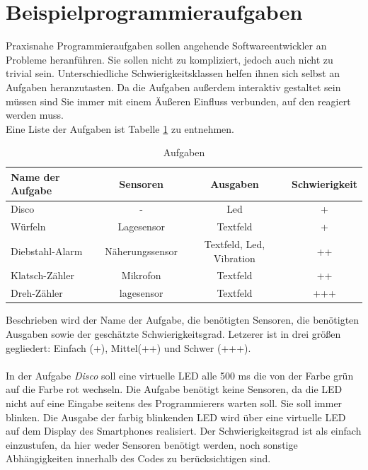 \documentclass[11pt,a4paper]{report}
\begin{document}
\section{Beispielprogrammieraufgaben}\label{sec:activities}
Praxisnahe Programmieraufgaben sollen angehende Softwareentwickler an Probleme heranführen.
Sie sollen nicht zu kompliziert, jedoch auch nicht zu trivial sein.
Unterschiedliche Schwierigkeitsklassen helfen ihnen sich selbst an Aufgaben heranzutasten.
Da die Aufgaben außerdem interaktiv gestaltet sein müssen sind Sie immer mit einem Äußeren Einfluss verbunden, auf den reagiert werden muss.
\\
Eine Liste der Aufgaben ist Tabelle \ref{tab:excercises} zu entnehmen.
\begin{table}[htbp]
  \centering
  \begin{tabular}{|l|c|c|c|}
      \hline
      \textbf{Name der Aufgabe} & \textbf{Sensoren} & \textbf{Ausgaben} & \textbf{Schwierigkeit} \\
      \hline
      Disco & - & Led & + \\
      \hline
      Würfeln & Lagesensor & Textfeld &+ \\
      \hline
      Diebstahl-Alarm & Näherungssensor & Textfeld, Led, Vibration & ++ \\
      \hline
      Klatsch-Zähler & Mikrofon & Textfeld & ++ \\
      \hline
      Dreh-Zähler & lagesensor & Textfeld & +++ \\
      \hline
  \end{tabular}
  \caption{Aufgaben}
  \label{tab:excercises}
\end{table}
Beschrieben wird der Name der Aufgabe, die benötigten Sensoren, die benötigten Ausgaben sowie der geschätzte Schwierigkeitsgrad.
Letzerer ist in drei größen gegliedert:
Einfach (+), Mittel(++) und Schwer (+++).
\\\\
In der Aufgabe \textit{Disco} soll eine virtuelle LED alle 500 ms die von der Farbe grün auf die Farbe rot wechseln.
Die Aufgabe benötigt keine Sensoren, da die LED nicht auf eine Eingabe seitens des Programmierers warten soll.
Sie soll immer blinken.
Die Ausgabe der farbig blinkenden LED wird über eine virtuelle LED auf dem Display des Smartphones realisiert.
Der Schwierigkeitsgrad ist als einfach einzustufen, da hier weder Sensoren benötigt werden, noch sonstige Abhängigkeiten innerhalb des Codes zu berücksichtigen sind.
\\\\
\end{document}
